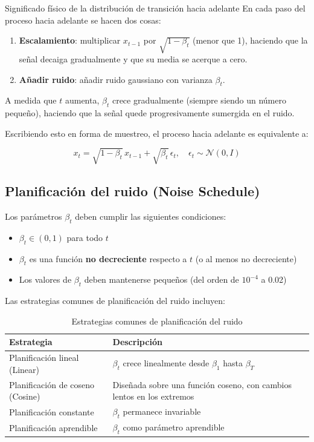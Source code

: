 \documentclass[a4paper]{article}
\begin{document}
\begin{importantbox}{Significado físico de la distribución de transición hacia adelante}
En cada paso del proceso hacia adelante se hacen dos cosas:
\begin{enumerate}
    \item \textbf{Escalamiento}: multiplicar $x_{t-1}$ por $\sqrt{1-\beta_t}$ (menor que 1), haciendo que la señal decaiga gradualmente y que su media se acerque a cero.
    \item \textbf{Añadir ruido}: añadir ruido gaussiano con varianza $\beta_t$.
\end{enumerate}
A medida que $t$ aumenta, $\beta_t$ crece gradualmente (siempre siendo un número pequeño), haciendo que la señal quede progresivamente sumergida en el ruido.
\end{importantbox}

Escribiendo esto en forma de muestreo, el proceso hacia adelante es equivalente a:

$$x_t = \sqrt{1 - \beta_t} \, x_{t-1} + \sqrt{\beta_t} \, \epsilon_t, \quad \epsilon_t \sim \mathcal{N}(0, I)$$

\subsection{Planificación del ruido (Noise Schedule)}

Los parámetros $\beta_t$ deben cumplir las siguientes condiciones:

\begin{itemize}
    \item $\beta_t \in (0, 1)$ para todo $t$
    \item $\beta_t$ es una función \textbf{no decreciente} respecto a $t$ (o al menos no decreciente)
    \item Los valores de $\beta_t$ deben mantenerse pequeños (del orden de $10^{-4}$ a 0.02)
\end{itemize}

Las estrategias comunes de planificación del ruido incluyen:

\begin{table}[H]
\centering
\begin{tabular}{ll}
\toprule
\textbf{Estrategia} & \textbf{Descripción} \\
\midrule
Planificación lineal (Linear) & $\beta_t$ crece linealmente desde $\beta_1$ hasta $\beta_T$ \\
Planificación de coseno (Cosine) & Diseñada sobre una función coseno, con cambios lentos en los extremos \\
Planificación constante & $\beta_t$ permanece invariable \\
Planificación aprendible & $\beta_t$ como parámetro aprendible \\
\bottomrule
\end{tabular}
\caption{Estrategias comunes de planificación del ruido}
\end{table}
\end{document}
